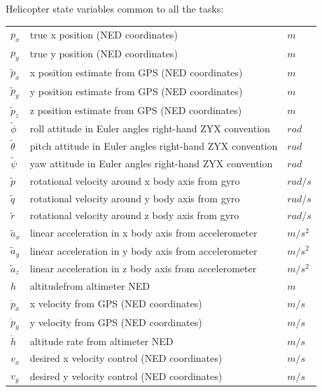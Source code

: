 \documentclass[a4paper,11pt]{report}
\begin{document}
Helicopter state variables common to all the tasks:
\begin{table}[ht]  
\begin{tabular}{l l l}
     $p_x$ & true x position (NED coordinates)            & $m$\\
     $p_y$ & true y position (NED coordinates)            & $m$\\
     $\tilde{p}_x$ & x position estimate from GPS (NED coordinates)            & $m$\\
     $\tilde{p}_y$ & y position estimate from GPS (NED coordinates)            & $m$\\
     $\tilde{p}_z$ & z position estimate from GPS (NED coordinates)            & $m$\\
     $\tilde{\phi}$ & roll attitude in Euler angles right-hand ZYX convention & $rad$\\
     $\tilde{\theta}$ & pitch attitude in Euler angles right-hand ZYX convention& $rad$\\
     $\tilde{\psi}$ & yaw attitude in Euler angles right-hand ZYX convention  & $rad$\\
     $\tilde{p}$  & rotational velocity around x body axis from gyro                 & $rad/s$\\ 
     $\tilde{q}$  & rotational velocity around y body axis from gyro                 & $rad/s$\\ 
     $\tilde{r}$  & rotational velocity around z body axis from gyro                & $rad/s$\\
     $\tilde{a}_x$ & linear acceleration in x body axis from accelerometer            & $m/s^2$\\
     $\tilde{a}_y$ & linear acceleration in y body axis from accelerometer             & $m/s^2$\\
     $\tilde{a}_z$ & linear acceleration in z body axis from accelerometer             & $m/s^2$\\
     $h$& altitude\footnotemark  from altimeter NED & $m$\\
     $\dot{p}_x$ & x velocity from GPS (NED coordinates)            & $m/s$\\
     $\dot{p}_y$ & y velocity from GPS (NED coordinates)            & $m/s$\\
     $\dot{h}$    & altitude rate from altimeter NED                   & $m/s$\\
     $v_x$ & desired x velocity control (NED coordinates)            & $m/s$\\ 
     $v_y$ & desired y velocity control (NED coordinates)            & $m/s$\\
\end{tabular}
\end{table}
\end{document}
